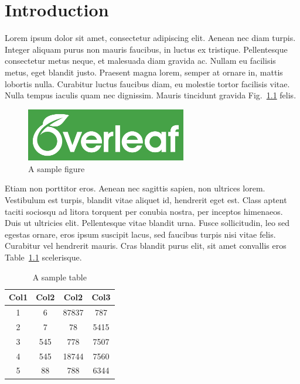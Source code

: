 \chapter{Introduction}

Lorem ipsum dolor sit amet, consectetur adipiscing elit. Aenean nec diam turpis. Integer aliquam purus non mauris faucibus, in luctus ex tristique. Pellentesque consectetur metus neque, et malesuada diam gravida ac. Nullam eu facilisis metus, eget blandit justo. Praesent magna lorem, semper at ornare in, mattis lobortis nulla. Curabitur luctus faucibus diam, eu molestie tortor facilisis vitae. Nulla tempus iaculis quam nec dignissim. Mauris tincidunt gravida Fig.~\ref{fig:my_label} felis.

\begin{figure}[htp]
    \centering
    \includegraphics[width=7cm]{figures/overleaf_wide_colour_green_bg.png}
    \caption{A sample figure}
    \label{fig:my_label}
\end{figure}

Etiam non porttitor eros. Aenean nec sagittis sapien, non ultrices lorem. Vestibulum est turpis, blandit vitae aliquet id, hendrerit eget est. Class aptent taciti sociosqu ad litora torquent per conubia nostra, per inceptos himenaeos. Duis ut ultricies elit. Pellentesque vitae blandit urna. Fusce sollicitudin, leo sed egestas ornare, eros ipsum suscipit lacus, sed faucibus turpis nisi vitae felis. Curabitur vel hendrerit mauris. Cras blandit purus elit, sit amet convallis eros Table~\ref{tab:my_label} scelerisque.

\begin{table}[h]
    \centering
    \caption{A sample table}
    \label{tab:my_label}
    \begin{tabular}{||c| c c c||} 
        \hline
        Col1 & Col2 & Col2 & Col3 \\ [0.5ex] 
        \hline\hline
        1 & 6 & 87837 & 787 \\ 
        \hline
        2 & 7 & 78 & 5415 \\
        \hline
        3 & 545 & 778 & 7507 \\
        \hline
        4 & 545 & 18744 & 7560 \\
        \hline
        5 & 88 & 788 & 6344 \\ [1ex] 
        \hline
    \end{tabular}
\end{table}

